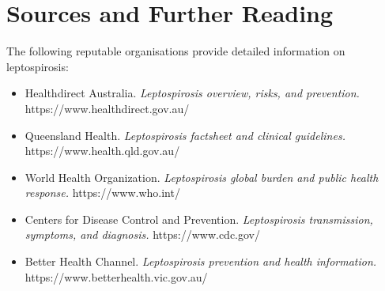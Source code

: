 \section*{Sources and Further Reading}
The following reputable organisations provide detailed information on leptospirosis:
\begin{itemize}
    \item Healthdirect Australia. \textit{Leptospirosis overview, risks, and prevention.} https://www.healthdirect.gov.au/
    \item Queensland Health. \textit{Leptospirosis factsheet and clinical guidelines.} https://www.health.qld.gov.au/
    \item World Health Organization. \textit{Leptospirosis global burden and public health response.} https://www.who.int/
    \item Centers for Disease Control and Prevention. \textit{Leptospirosis transmission, symptoms, and diagnosis.} https://www.cdc.gov/
    \item Better Health Channel. \textit{Leptospirosis prevention and health information.} https://www.betterhealth.vic.gov.au/
\end{itemize}
